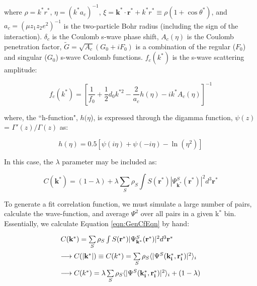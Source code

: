 \documentclass[ALICE,manyauthors]{cernphprep}
\begin{document}
where $\rho = k^{*}r^{*}$, $\eta = (k^{*}a_{c})^{-1}$, $\xi = \mathbf{k^{*}} \cdot \mathbf{r^{*}} + k^{*}r^{*} \equiv \rho(1+\cos\theta^{*})$, and $a_{c} = (\mu z_{1}z_{2}e^{2})^{-1}$ is the two-particle Bohr radius (including the sign of the interaction).  
$\delta_{c}$ is the Coulomb s-wave phase shift, $A_{c}(\eta)$ is the Coulomb penetration factor, $\tilde{G} = \sqrt{A_{c}}(G_{0} + iF_{0})$ is a combination of the regular ($F_{0}$) and singular ($G_{0}$) s-wave Coulomb functions.  
$f_{c}(k^{*})$ is the s-wave scattering amplitude:

\begin{equation}
 f_{c}(k^{*}) = [\frac{1}{f_{0}} + \frac{1}{2}d_{0}k^{*2} - \frac{2}{a_{c}}h(\eta) - ik^{*}A_{c}(\eta)]^{-1}
\label{eqn:CoulombScattAmp}
\end{equation}

where, the ``h-function", $h(\eta$), is expressed through the digamma function, $\psi(z)$ = $\Gamma'(z)/\Gamma(z)$ as:

\begin{equation}
 h(\eta) = 0.5[\psi(i\eta) + \psi(-i\eta) - \ln(\eta^{2})]
\label{eqn:LednickyHFunction}
\end{equation} 

In this case, the $\lambda$ parameter may be included as: 

\begin{equation}
 C(\mathbf{k^{*}}) = (1 - \lambda) + \lambda\sum\limits_{S}\rho_{S}\int S(\mathbf{r^{*}})|\Psi^{S}_{\mathbf{k^{*}}}(\mathbf{r^{*}})|^{2}d^{3}\mathbf{r^{*}}
\label{eqn:GenCfEqnwLambda}
\end{equation}


To generate a fit correlation function, we must simulate a large number of pairs, calculate the wave-function, and average $\Psi^{2}$ over all pairs in a given k$^{*}$ bin.  
Essentially, we calculate Equation \ref{eqn:GenCfEqn} by hand:

\begin{equation}
\label{eqn:CoulombEqn2}
\begin{array}{l}
\vspace{2mm}
  C(\mathbf{k^{*}}) = \sum\limits_{S}\rho_{S}\int S(\mathbf{r^{*}})|\Psi^{S}_{\mathbf{k^{*}}}(\mathbf{r^{*}})|^{2}d^{3}\mathbf{r^{*}} \\
\vspace{2mm}
  \longrightarrow C(|\mathbf{k^{*}}|) \equiv C(k^{*}) = \sum\limits_{S}\rho_{S}\langle |\Psi^{S}(\mathbf{k^{*}_{i}},\mathbf{r^{*}_{i}})|^{2} \rangle_{i} \\
\vspace{2mm}
  \longrightarrow C(k^{*}) = \lambda\sum\limits_{S}\rho_{S}\langle |\Psi^{S}(\mathbf{k^{*}_{i}},\mathbf{r^{*}_{i}})|^{2} \rangle_{i} + (1-\lambda)

\end{array}
\end{equation}
\end{document}

